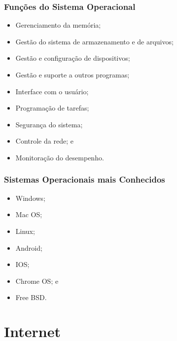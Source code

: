 \documentclass[aspectratio=169]{beamer} %
\begin{document}
\begin{frame}
	\frametitle{Funções do Sistema Operacional}
		
	\begin{itemize}
		\item Gerenciamento da memória;
		\item Gestão do sistema de armazenamento e de arquivos; 
		\item Gestão e configuração de dispositivos;
		\item Gestão e suporte a outros programas; 
		\item Interface com o usuário;
		\item Programação de tarefas;
		\item Segurança do sistema;
		\item Controle da rede; e
		\item Monitoração do desempenho.
	\end{itemize}
\end{frame}

\begin{frame}
	\frametitle{Sistemas Operacionais mais Conhecidos}
		
	\begin{itemize}
		\item Windows;
		\item Mac OS;
		\item Linux;
		\item Android;
		\item IOS;
		\item Chrome OS; e
		\item Free BSD.
	\end{itemize}
\end{frame}

\section{Internet}
\end{document}
